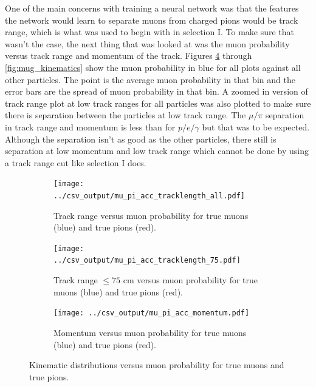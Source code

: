 One of the main concerns with training a neural network was that the features the network would learn to separate muons from charged pions would be track range, which is what was used to begin with in selection I. To make sure that wasn't the case, the next thing that was looked at was the muon probability versus track range and momentum of the track. Figures \ref{fig:mupi_kinematics} through \ref{fig:mug_kinematics} show the muon probability in blue for all plots against all other particles. The point is the average muon probability in that bin and the error bars are the spread of muon probability in that bin. A zoomed in version of track range plot at low track ranges for all particles was also plotted to make sure there is separation between the particles at low track range. The $\mu/\pi$ separation in track range and momentum is less than for $p/e/\gamma$ but that was to be expected. Although the separation isn't as good as the other particles, there still is separation at low momentum and low track range which cannot be done by using a track range cut like selection I does.  
\begin{figure}[htp]
\centering
	\begin{subfigure}[t]{.475\textwidth}
		\centering
		\texttt{[image: ../csv\_output/mu\_pi\_acc\_tracklength\_all.pdf]}
		\caption{Track range versus muon probability for true muons (blue) and true pions (red).}
		\label{fig:mupi_tracklength}
	\end{subfigure}
	\begin{subfigure}[t]{.475\textwidth}
		\centering
		\texttt{[image: ../csv\_output/mu\_pi\_acc\_tracklength\_75.pdf]}
		\caption{Track range $\leq 75$ cm versus muon probability for true muons (blue) and true pions (red).}
		\label{fig:mupi_tracklength75}
	\end{subfigure}
	\begin{subfigure}[t]{.475\textwidth}
		\centering
		\texttt{[image: ../csv\_output/mu\_pi\_acc\_momentum.pdf]}
		\caption{Momentum versus muon probability for true muons (blue) and true pions (red).}
		\label{fig:mupi_momentum}
	\end{subfigure}
\caption{Kinematic distributions versus muon probability for true muons and true pions.}
\label{fig:mupi_kinematics}
\end{figure}


